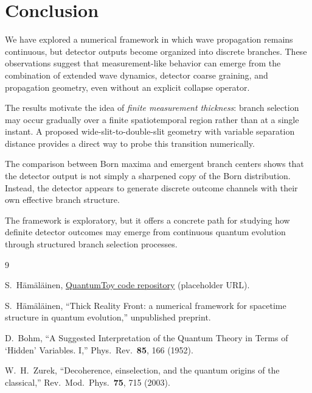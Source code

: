 \documentclass[aps,prl,reprint]{revtex4-2}
\begin{document}
\section{Conclusion}

We have explored a numerical framework in which wave propagation remains
continuous, but detector outputs become organized into discrete branches.
These observations suggest that measurement-like behavior can emerge from the
combination of extended wave dynamics, detector coarse graining, and propagation
geometry, even without an explicit collapse operator.

The results motivate the idea of \emph{finite measurement thickness}: branch
selection may occur gradually over a finite spatiotemporal region rather than
at a single instant. A proposed wide-slit-to-double-slit geometry with variable
separation distance provides a direct way to probe this transition numerically.

The comparison between Born maxima and emergent branch centers shows that the
detector output is not simply a sharpened copy of the Born distribution. Instead,
the detector appears to generate discrete outcome channels with their own
effective branch structure.

The framework is exploratory, but it offers a concrete path for studying how
definite detector outcomes may emerge from continuous quantum evolution through
structured branch selection processes.

\begin{thebibliography}{9}

S.~H\"am\"al\"ainen,
\href{https://github.com/placeholder/quantumtoy}{QuantumToy code repository}
(placeholder URL).

S.~H\"am\"al\"ainen,
``Thick Reality Front: a numerical framework for spacetime structure in quantum evolution,''
unpublished preprint.

D.~Bohm,
``A Suggested Interpretation of the Quantum Theory in Terms of `Hidden' Variables. I,''
Phys.\ Rev.\ \textbf{85}, 166 (1952).

W.~H.~Zurek,
``Decoherence, einselection, and the quantum origins of the classical,''
Rev.\ Mod.\ Phys.\ \textbf{75}, 715 (2003).

\end{thebibliography}
\end{document}
